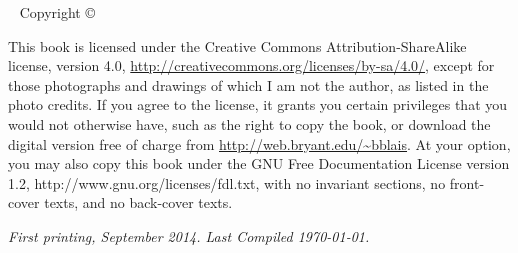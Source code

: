 
\newpage\thispagestyle{empty}


\newpage\thispagestyle{empty}
\vfill
{}
\vfill
{}
\vfill





\maketitle


\newpage
\begin{fullwidth}
~\vfill
\thispagestyle{empty}
\setlength{\parindent}{0pt}
\setlength{\parskip}{\baselineskip}
Copyright \copyright\ \the\year\ \thanklessauthor

\par{}

\par{}

\par     This book is licensed under the Creative Commons
    Attribution-ShareAlike license, version 4.0, 
    \url{http://creativecommons.org/licenses/by-sa/4.0/},
    except for those photographs and
    drawings of which I am not the author, as listed in the photo credits.
    If you agree to the license, it grants you certain privileges that
    you would not otherwise have, such as the right to copy the book,
    or download the digital version free of charge from
    \url{http://web.bryant.edu/~bblais}. At your option, you may also copy this book
    under the GNU Free Documentation License version 1.2, http://www.gnu.org/licenses/fdl.txt,
    with no invariant sections, no front-cover texts, and no back-cover texts.

\par\textit{First printing, September 2014.  Last Compiled \today.}
\end{fullwidth}

